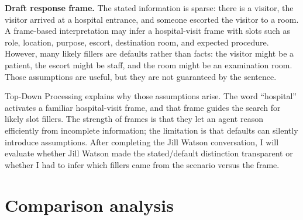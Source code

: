\documentclass[
	letterpaper, %
]{jdf}
\begin{document}
\textbf{Draft response frame.} The stated information is sparse: there is a visitor, the visitor arrived at a hospital entrance, and someone escorted the visitor to a room. A frame-based interpretation may infer a hospital-visit frame with slots such as role, location, purpose, escort, destination room, and expected procedure. However, many likely fillers are defaults rather than facts: the visitor might be a patient, the escort might be staff, and the room might be an examination room. Those assumptions are useful, but they are not guaranteed by the sentence.

Top-Down Processing explains why those assumptions arise. The word ``hospital'' activates a familiar hospital-visit frame, and that frame guides the search for likely slot fillers. The strength of frames is that they let an agent reason efficiently from incomplete information; the limitation is that defaults can silently introduce assumptions. After completing the Jill Watson conversation, I will evaluate whether Jill Watson made the stated/default distinction transparent or whether I had to infer which fillers came from the scenario versus the frame.


\section{Comparison analysis}

%
%
%
%
%
%
\end{document}
